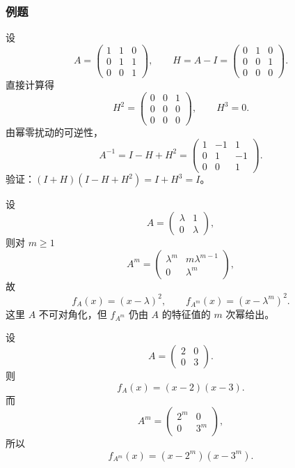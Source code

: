 \subsubsection{例题}

\begin{example}[幂零矩阵求逆]
设
\[
A=\begin{pmatrix}
1 & 1 & 0\\
0 & 1 & 1\\
0 & 0 & 1
\end{pmatrix},
\qquad
H=A-I=
\begin{pmatrix}
0 & 1 & 0\\
0 & 0 & 1\\
0 & 0 & 0
\end{pmatrix}.
\]
直接计算得
\[
H^2=
\begin{pmatrix}
0 & 0 & 1\\
0 & 0 & 0\\
0 & 0 & 0
\end{pmatrix},
\qquad
H^3=0 .
\]
由幂零扰动的可逆性，
\[
A^{-1}=I-H+H^2
=
\begin{pmatrix}
1 & -1 & 1\\
0 & 1 & -1\\
0 & 0 & 1
\end{pmatrix}.
\]
验证：\((I+H)(I-H+H^2)=I+H^3=I\)。
\end{example}

\begin{example}[上三角矩阵方幂的特征多项式]
设
\[
A=\begin{pmatrix}\lambda&1\\0&\lambda\end{pmatrix},
\]
则对 \(m\ge1\)
\[
A^m=\begin{pmatrix}\lambda^m&m\lambda^{m-1}\\0&\lambda^m\end{pmatrix},
\]
故
\[
f_A(x)=(x-\lambda)^2,\qquad f_{A^m}(x)=(x-\lambda^m)^2 .
\]
这里 \(A\) 不可对角化，但 \(f_{A^m}\) 仍由 \(A\) 的特征值的 \(m\) 次幂给出。
\end{example}

\begin{example}[可对角化的情形]
设
\[
A=\begin{pmatrix}
2 & 0\\
0 & 3
\end{pmatrix}.
\]
则
\[
f_A(x)=(x-2)(x-3).
\]
而
\[
A^m=\begin{pmatrix}
2^m & 0\\
0 & 3^m
\end{pmatrix},
\]
所以
\[
f_{A^m}(x)=(x-2^m)(x-3^m).
\]
\end{example}

